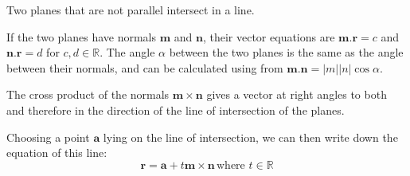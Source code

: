 
\newcommand{\v}[1]{\mathbf{#1}}
Two planes that are not parallel intersect in a line.
\par
If the two planes have normals $\v{m}$ and $\v{n}$, their vector equations are $\v{m}.\v{r}=c$ and $\v{n}.\v{r}=d$ for $c,d \in \mathbb{R}$. The angle $\alpha$ between the two planes is the same as the angle between their normals, and can be calculated using from $\v{m}.\v{n} = |m||n|\cos \alpha$.
\par
The cross product of the normals $\v{m} \times \v{n}$ gives a vector at right angles to both and therefore in the direction of the line of intersection of the planes.
\par
Choosing a point $\v{a}$ lying on the line of intersection, we can then write down the equation of this line:
$$
\v{r} = \v{a} + t\v{m} \times \v{n} \,\mbox{where } t \in \mathbb{R}
$$
  